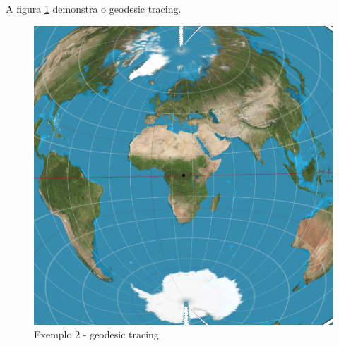 A figura \ref{img:ex2gt} demonstra o geodesic tracing.
\begin{figure}[!ht]
    \includegraphics[width=\linewidth]{ex2gt.png}
    \caption{Exemplo 2 - geodesic tracing}
    \label{img:ex2gt}
\end{figure}